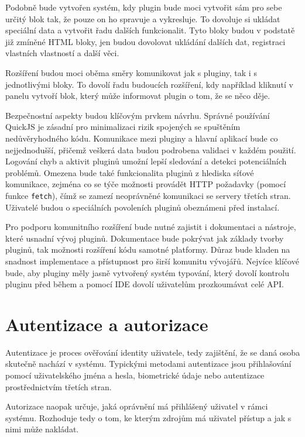 Podobně bude vytvořen systém, kdy plugin bude moci vytvořit sám pro sebe určitý blok tak, že pouze on ho spravuje a vykresluje.
To dovoluje si ukládat speciální data a vytvořit řadu dalších funkcionalit.
Tyto bloky budou v podstatě již zmíněné HTML bloky, jen budou dovolovat ukládání dalších dat, registraci vlastních vlastností a další věci.

Rozšíření budou moci oběma směry komunikovat jak s pluginy, tak i s jednotlivými bloky.
To dovolí řadu budoucích rozšíření, kdy například kliknutí v panelu vytvoří blok, který může informovat plugin o tom, že se něco děje.

Bezpečnostní aspekty budou klíčovým prvkem návrhu.
Správné používání QuickJS je zásadní pro minimalizaci rizik spojených se spuštěním nedůvěryhodného kódu.
Komunikace mezi pluginy a hlavní aplikací bude co nejjednodušší, přičemž veškerá data budou podrobena validaci v každém použití.
Logování chyb a aktivit pluginů umožní lepší sledování a detekci potenciálních problémů.
Omezena bude také funkcionalita pluginů z hlediska síťové komunikace, zejména co se týče možnosti provádět HTTP požadavky (pomocí funkce \texttt{fetch}), čímž se zamezí neoprávněné komunikaci se servery třetích stran.
Uživatelé budou o speciálních povoleních pluginů obeznámeni před instalací.

Pro podporu komunitního rozšíření bude nutné zajistit i dokumentaci a nástroje, které usnadní vývoj pluginů. 
Dokumentace bude pokrývat jak základy tvorby pluginů, tak možnosti rozšíření kódu samotné platformy. 
Důraz bude kladen na snadnost implementace a přístupnost pro širší komunitu vývojářů.
Nejvíce klíčové bude, aby pluginy měly jasně vytvořený systém typování, který dovolí kontrolu pluginu před během a pomocí IDE dovolí uživatelům prozkoumávat celé API.

\section{Autentizace a autorizace}\label{text:navrh/auth}

Autentizace je proces ověřování identity uživatele, tedy zajištění, že se daná osoba skutečně nachází v systému. 
Typickými metodami autentizace jsou přihlašování pomocí uživatelského jména a hesla, biometrické údaje nebo autentizace prostřednictvím třetích stran.

Autorizace naopak určuje, jaká oprávnění má přihlášený uživatel v rámci systému.
Rozhoduje tedy o tom, ke kterým zdrojům má uživatel přístup a jak s nimi může nakládat.

